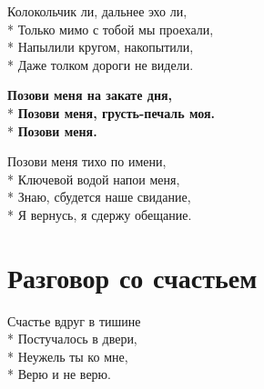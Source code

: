 \medskip

\begin{minipage}{\linewidth}
Колокольчик ли, дальнее эхо ли,\\*
Только мимо с тобой мы проехали,\\*
Напылили кругом, накопытили,\\*
Даже толком дороги не видели.\\
\end{minipage}\par\medskip\nobreak

\medskip

\begin{minipage}{\linewidth}
\hspace*{1.5em}\textbf{Позови меня на закате дня,}\\*
\hspace*{1.5em}\textbf{Позови меня, грусть-печаль моя.}\\*
\hspace*{1.5em}\textbf{Позови меня.}\\
\end{minipage}\par\medskip\nobreak

\medskip

\begin{minipage}{\linewidth}
Позови меня тихо по имени,\\*
Ключевой водой напои меня,\\*
Знаю, сбудется наше свидание,\\*
Я вернусь, я сдержу обещание.\\
\end{minipage}

\vspace{\fill}\newpage

\section{Разговор со счастьем}
\label{song:Разговор_со_счастьем}

\medskip

\begin{minipage}{\linewidth}
Счастье вдруг в тишине\\*
Постучалось в двери,\\*
Неужель ты ко мне,\\*
Верю и не верю.\\
\end{minipage}\par\medskip\nobreak


